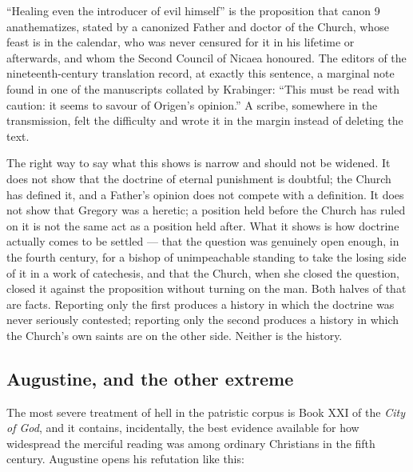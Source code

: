 ``Healing even the introducer of evil himself'' is the proposition that canon 9 anathematizes, stated by a canonized Father and doctor of the Church, whose feast is in the calendar, who was never censured for it in his lifetime or afterwards, and whom the Second Council of Nicaea honoured. The editors of the nineteenth-century translation record, at exactly this sentence, a marginal note found in one of the manuscripts collated by Krabinger: ``This must be read with caution: it seems to savour of Origen's opinion.'' A scribe, somewhere in the transmission, felt the difficulty and wrote it in the margin instead of deleting the text.

The right way to say what this shows is narrow and should not be widened. It does not show that the doctrine of eternal punishment is doubtful; the Church has defined it, and a Father's opinion does not compete with a definition. It does not show that Gregory was a heretic; a position held before the Church has ruled on it is not the same act as a position held after. What it shows is how doctrine actually comes to be settled --- that the question was genuinely open enough, in the fourth century, for a bishop of unimpeachable standing to take the losing side of it in a work of catechesis, and that the Church, when she closed the question, closed it against the proposition without turning on the man. Both halves of that are facts. Reporting only the first produces a history in which the doctrine was never seriously contested; reporting only the second produces a history in which the Church's own saints are on the other side. Neither is the history.

\subsection{Augustine, and the other extreme}

The most severe treatment of hell in the patristic corpus is Book XXI of the \emph{City of God}, and it contains, incidentally, the best evidence available for how widespread the merciful reading was among ordinary Christians in the fifth century. Augustine opens his refutation like this:

